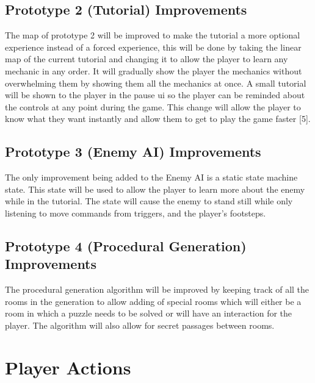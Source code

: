 \documentclass{article}
\begin{document}
\subsection{Prototype 2 (Tutorial) Improvements}
The map of prototype 2 will be improved to make the tutorial a more optional experience instead of a forced
experience, this will be done by taking the linear map of the current tutorial and changing it to allow
the player to learn any mechanic in any order.
It will gradually show the player the mechanics without overwhelming them by showing them all
the mechanics at once. A small tutorial will be shown to the player in the pause ui so the player can
be reminded about the controls at any point during the game.
This change will allow the player to know what they want instantly and allow them to get to play the game
faster [5].
\subsection{Prototype 3 (Enemy AI) Improvements}
The only improvement being added to the Enemy AI is a static state machine state. This state will be used to
allow the player to learn more about the enemy while in the tutorial. The state will cause the enemy to stand still
while only listening to move commands from triggers, and the player's footsteps.
\subsection{Prototype 4 (Procedural Generation) Improvements}
The procedural generation algorithm will be improved by keeping track of all the rooms in the generation
to allow adding of special rooms which will either be a room in which a puzzle needs to be solved or 
will have an interaction for the player. The algorithm will also allow for secret passages between
rooms. 

\section{Player Actions}
\end{document}
